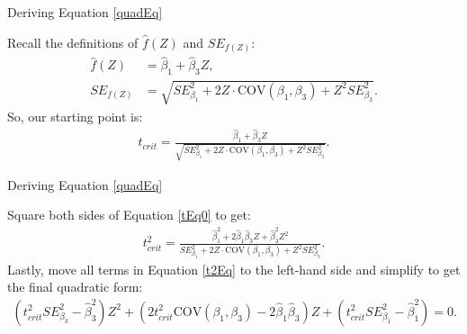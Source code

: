 \documentclass{beamer}\usepackage[]{graphicx}\usepackage[]{color}
\begin{document}

\begin{frame}{Deriving Equation \ref{quadEq}}
  
  Recall the definitions of $\hat{f}(Z)$ and $SE_{f(Z)}$:
  \begin{align*}
    \hat{f}(Z) &= \hat{\beta}_1 + \hat{\beta}_3Z,\\[10pt]
    SE_{f(Z)} &= \sqrt{SE_{\beta_1}^2 + 2Z \cdot \text{COV}(\beta_1, \beta_3) + Z^2 SE_{\beta_3}^2}.
  \end{align*}
  So, our starting point is:
  \begin{align}
    t_{crit} = \frac{\hat{\beta}_1 + \hat{\beta}_3Z}{\sqrt{SE_{\beta_1}^2 + 2Z \cdot \text{COV}(\beta_1, \beta_3) + Z^2 SE_{\beta_3}^2}}. \label{tEq0}
  \end{align}
  
\end{frame}


\begin{frame}{Deriving Equation \ref{quadEq}}
  
  Square both sides of Equation \ref{tEq0} to get:
  \begin{align}
    t_{crit}^2 = \frac{\hat{\beta}_1^2 + 2\hat{\beta}_1\hat{\beta}_3Z + \hat{\beta}_3^2Z^2}{SE_{\beta_1}^2 + 2Z \cdot \text{COV}(\beta_1, \beta_3) + Z^2 SE_{\beta_3}^2}. \label{t2Eq}
    \end{align}
  Lastly, move all terms in Equation \ref{t2Eq} to the left-hand side and 
  simplify to get the final quadratic form:
  \begin{align*}
    \left( t_{crit}^2 SE_{\beta_3}^2 - \hat{\beta}_3^2 \right) Z^2 +
    \left( 2t_{crit}^2 \text{COV}(\beta_1, \beta_3) - 2 \hat{\beta}_1 \hat{\beta}_3 \right) Z +
    \left( t_{crit}^2 SE_{\beta_1}^2 - \hat{\beta}_1^2 \right) = 0.
  \end{align*}
  
\end{frame}

\end{document}
